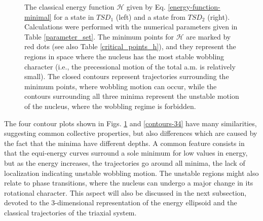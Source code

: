 \documentclass[myclassdoc,debug]{rjparticle}
\begin{document}
\begin{figure}[ht]
\begin{minipage}{.5\textwidth}
\end{minipage}
\caption{The classical energy function $\mathcal{H}$ given by Eq. \ref{energy-function-minimal} for a state in $TSD_1$ (left) and a state from $TSD_2$ (right). Calculations were performed with the numerical parameters given in Table \ref{parameter_set}. The minimum points for $\mathcal{H}$ are marked by red dots (see also Table \ref{critical_points_h}), and they represent the regions in space where the nucleus has the most stable wobbling character (i.e., the precessional motion of the total a.m. is relatively small). The closed contours represent trajectories surrounding the minimum points, where wobbling motion can occur, while the contours surrounding all three minima represent the unstable motion of the nucleus, where the wobbling regime is forbidden.}
    \label{contours-12}
\end{figure}

The four contour plots shown in Figs. \ref{contours-12} and \ref{contours-34} have many similarities, suggesting common collective properties, but also differences which are caused by the fact that the minima have different depths. A common feature consists in that the equi-energy curves surround a sole minimum for low values in energy, but as the energy increases, the trajectories go around all minima, the lack of localization indicating unstable wobbling motion. The unstable regions might also relate to phase transitions, where the nucleus can undergo a major change in its rotational character. This aspect will also be discussed in the next subsection, devoted to the 3-dimensional representation of the energy ellipsoid and the classical trajectories of the triaxial system.
\end{document}

